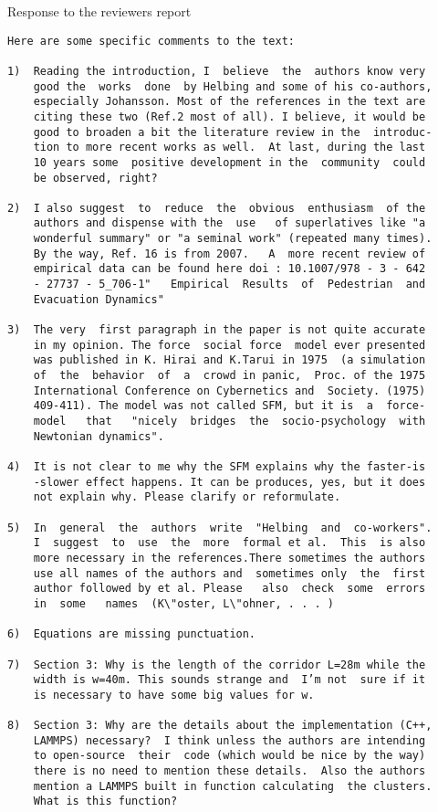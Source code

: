 \documentclass[a4paper,12pt]{letter}
\begin{document}
\begin{letter}{Response to the reviewers report}
\begin{verbatim}
Here are some specific comments to the text:

1)  Reading the introduction, I  believe  the  authors know very
    good the  works  done  by Helbing and some of his co-authors,
    especially Johansson. Most of the references in the text are
    citing these two (Ref.2 most of all). I believe, it would be
    good to broaden a bit the literature review in the  introduc-
    tion to more recent works as well.  At last, during the last
    10 years some  positive development in the  community  could 
    be observed, right?

2)  I also suggest  to  reduce  the  obvious  enthusiasm  of the
    authors and dispense with the  use   of superlatives like "a 
    wonderful summary" or "a seminal work" (repeated many times). 
    By the way, Ref. 16 is from 2007.   A  more recent review of
    empirical data can be found here doi : 10.1007/978 - 3 - 642
    - 27737 - 5_706-1"   Empirical  Results  of  Pedestrian  and 
    Evacuation Dynamics"

3)  The very  first paragraph in the paper is not quite accurate
    in my opinion. The force  social force  model ever presented
    was published in K. Hirai and K.Tarui in 1975  (a simulation
    of  the  behavior  of  a  crowd in panic,  Proc. of the 1975 
    International Conference on Cybernetics and  Society. (1975)
    409-411). The model was not called SFM, but it is  a  force-
    model   that   "nicely  bridges  the  socio-psychology  with 
    Newtonian dynamics".

4)  It is not clear to me why the SFM explains why the faster-is
    -slower effect happens. It can be produces, yes, but it does
    not explain why. Please clarify or reformulate.

5)  In  general  the  authors  write  "Helbing  and  co-workers".
    I  suggest  to  use  the  more  formal et al.  This  is also
    more necessary in the references.There sometimes the authors
    use all names of the authors and  sometimes only  the  first
    author followed by et al. Please   also  check  some  errors
    in  some   names  (K\"oster, L\"ohner, . . . )

6)  Equations are missing punctuation.

7)  Section 3: Why is the length of the corridor L=28m while the
    width is w=40m. This sounds strange and  I’m not  sure if it 
    is necessary to have some big values for w.

8)  Section 3: Why are the details about the implementation (C++, 
    LAMMPS) necessary?  I think unless the authors are intending
    to open-source  their  code (which would be nice by the way)
    there is no need to mention these details.  Also the authors
    mention a LAMMPS built in function calculating  the clusters.
    What is this function?


\end{verbatim}
\end{letter}
\end{document}
